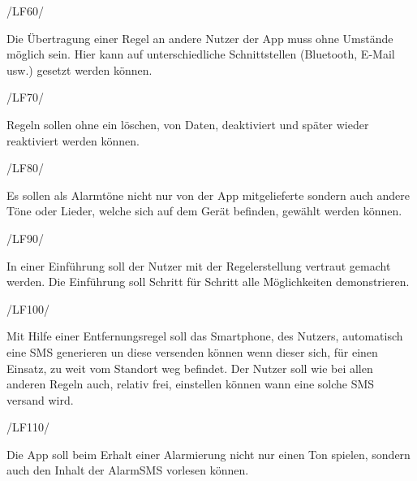 \begin{minipage}{3cm}
/LF60/
\end{minipage}
\begin{minipage}{13cm}
Die \"Ubertragung einer Regel an andere Nutzer der App muss ohne Umst\"ande m\"oglich sein. Hier kann auf unterschiedliche Schnittstellen (Bluetooth, E-Mail usw.) gesetzt werden k\"onnen. \\
\end{minipage}
\begin{minipage}{3cm}
/LF70/
\end{minipage}
\begin{minipage}{13cm}
Regeln sollen ohne ein l\"oschen, von Daten, deaktiviert und sp\"ater wieder reaktiviert werden k\"onnen.\\
\end{minipage}
\begin{minipage}{3cm}
/LF80/
\end{minipage}
\begin{minipage}{13cm}
Es sollen als Alarmt\"one nicht nur von der App mitgelieferte sondern auch andere T\"one oder Lieder, welche sich auf dem Ger\"at befinden, gew\"ahlt werden k\"onnen.\\
\end{minipage}
\begin{minipage}{3cm}
/LF90/
\end{minipage}
\begin{minipage}{13cm}
In einer Einf\"uhrung soll der Nutzer mit der Regelerstellung vertraut gemacht werden. Die Einf\"uhrung soll Schritt f\"ur Schritt alle M\"oglichkeiten demonstrieren.\\
\end{minipage}
\begin{minipage}{3cm}
/LF100/
\end{minipage}
\begin{minipage}{13cm}
Mit Hilfe einer Entfernungsregel soll das Smartphone, des Nutzers, automatisch eine SMS generieren un diese versenden k\"onnen wenn dieser sich, f\"ur einen Einsatz, zu weit vom Standort weg befindet.
Der Nutzer soll wie bei allen anderen Regeln auch, relativ frei, einstellen k\"onnen wann eine solche SMS versand wird.\\
\end{minipage}
\begin{minipage}{3cm}
/LF110/
\end{minipage}
\begin{minipage}{13cm}
Die App soll beim Erhalt einer Alarmierung nicht nur einen Ton spielen, sondern auch den Inhalt der AlarmSMS vorlesen k\"onnen.\\
\end{minipage}

